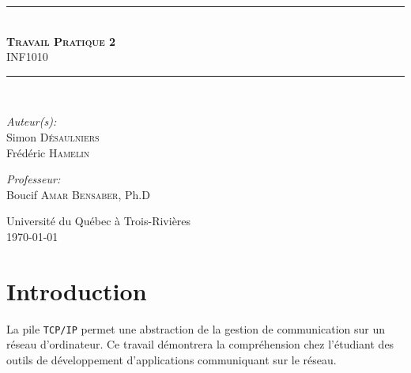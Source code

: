 \documentclass[12pt,french]{article}
\begin{document}
    \begin{titlepage}
        \begin{center}
            \noindent\rule{13cm}{1pt}\\[0.4cm]
            \textsc{\huge \bfseries Travail Pratique 2}\\
                                    INF1010\\[0.4cm]
            \noindent\rule{13cm}{1pt}\\[5cm]

            \begin{minipage}{0.4\textwidth}
                \begin{flushleft}
                \large\emph{Auteur(s):}\\[0.5cm]
                    Simon \textsc{Désaulniers}\\
                    Frédéric \textsc{Hamelin}
                \end{flushleft}
            \end{minipage}
            \begin{minipage}{0.5\textwidth}
                \begin{flushright} \large
                    \emph{Professeur:} \\[0.5cm]
                    Boucif \textsc{Amar Bensaber}, Ph.D
                    \vspace{\parskip}
                \end{flushright}
            \end{minipage}

            \vfill
            {\large Université du Québec à Trois-Rivières\\ \today}
        \end{center}
        \thispagestyle{empty}
    \end{titlepage}
    \setcounter{page}{1}

    \tableofcontents
    \newpage

    \setcounter{page}{1}

    \section{Introduction} %
    \label{sec:intro}
        La pile {\tt TCP/IP} permet une abstraction de la gestion de communication sur un réseau
        d'ordinateur. Ce travail démontrera la compréhension chez l'étudiant des outils de
        développement d'applications communiquant sur le réseau.
\end{document}

